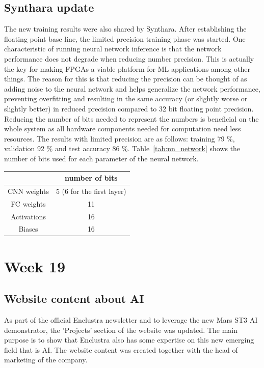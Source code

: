 \subsection{Synthara update}
The new training results were also shared by Synthara. After establishing the floating point base line, the limited precision training phase was started. One characteristic of running neural network inference is that the network performance does not degrade when reducing number precision. This is actually the key for making \acp{FPGA} a viable platform for \ac{ML} applications among other things. The reason for this is that reducing the precision can be thought of as adding noise to the neural network and helps generalize the network performance, preventing overfitting and resulting in the same accuracy (or slightly worse or slightly better) in reduced precision compared to 32 bit floating point precision. Reducing the number of bits needed to represent the numbers is beneficial on the whole system as all hardware components needed for computation need less resources. The results with limited precision are as follows: training 79 \%, validation 92 \% and test accuracy 86 \%. Table~\ref{tab:nn_network} shows the number of bits used for each parameter of the neural network.
\begin{center}
 \begin{tabular}{|c | c|} 
 \hline
  & number of bits \\ [0.5ex] 
 \hline
 CNN weights & 5 (6 for the first layer)\\ 
 \hline
 FC weights & 11 \\
 \hline
 Activations & 16  \\
 \hline
 Biases & 16 \\
 \hline
\end{tabular}
	\label{tab:nn_network}
\end{center}

\section{Week 19}
\subsection{Website content about \acs{AI}}
As part of the official Enclustra newsletter and to leverage the new Mars ST3 \ac{AI} demonstrator, the 'Projects' section of the website was updated. The main purpose is to show that Enclustra also has some expertise on this new emerging field that is \ac{AI}. The website content was created together with the head of marketing of the company.
